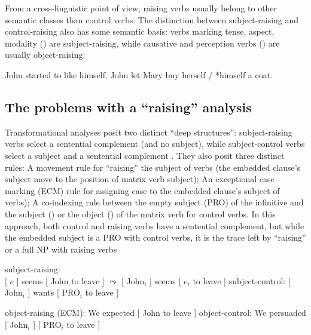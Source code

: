 \documentclass[output=paper]{langsci/langscibook}
\begin{document}
	From a cross-linguistic point of view, raising verbs usually belong to other semantic classes than control verbs. The distinction between subject-raising and control-raising also has some semantic basis: verbs marking tense, aspect, modality () are subject-raising, while
causative and perception verbs () are usually object-raising:

	\begin{exe}
\ex  \begin{xlist}
\ex John started to like himself.
\ex John let Mary buy herself / *himself a coat.
	 \end{xlist}
	 \end{exe}
	
\subsection{The problems with a ``raising'' analysis}

Transformational analyses posit two distinct ``deep structures'': subject-raising verbs select a sentential complement (and no subject), while subject-control verbs select a subject and a sentential complement \citep{Postal1974, Chomsky1981}. They also
posit three distinct rules:  A movement rule for ``raising'' the subject of  verbs (the embedded clause's subject move to the position of matrix verb subject); An exceptional case marking (ECM) rule for assigning case to the embedded clause's subject of  verbs); A co-indexing rule between the empty subject (PRO) of the infinitive and the subject () or the object () of the matrix verb for control verbs.
In this approach, both control and raising verbs have a sentential complement, but while the embedded subject is a PRO with control verbs, it is the trace left by ``raising'' or a full NP with raising verbs
	
\begin{exe}
\ex  \begin{xlist}
\ex 	subject-raising:\\
{}[ $e$ ] seems [ John to leave ] 
$\leadsto$  
{}[ John$_{i}$ ] seems [ $e_{i}$ to leave ]	
\ex subject-control:  
{}[ John$_{i}$ ] wants [ PRO$_{i}$ to leave ]	
 \end{xlist}
 \end{exe}

\begin{exe}
\ex  \begin{xlist}
\ex 	object-raising (ECM): We expected [ John to leave ] 	
\ex object-control: We persuaded  
{}[ John$_{i}$ ]  [ PRO$_{i}$ to leave ]	
 \end{xlist}
 \end{exe}
\end{document}
